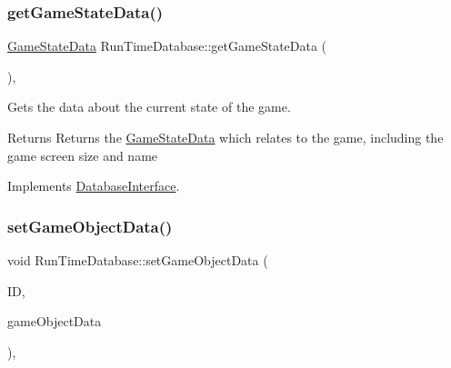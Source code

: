 \mbox{\label{class_run_time_database_a15d6105d3d772f604c42813e50ba4ee3}} 
\subsubsection{\texorpdfstring{get\+Game\+State\+Data()}{getGameStateData()}}
{\footnotesize\ttfamily \hyperlink{struct_game_state_data}{Game\+State\+Data} Run\+Time\+Database\+::get\+Game\+State\+Data (\begin{DoxyParamCaption}{ }\end{DoxyParamCaption})\hspace{0.3cm}{\ttfamily [override]}, {\ttfamily [virtual]}}



Gets the data about the current state of the game. 

\begin{DoxyReturn}{Returns}
Returns the \hyperlink{struct_game_state_data}{Game\+State\+Data} which relates to the game, including the game screen size and name 
\end{DoxyReturn}


Implements \hyperlink{class_database_interface_a5972ccdce7669da4eef8ab82c69fe073}{Database\+Interface}.

\mbox{\label{class_run_time_database_a9d2c5c2f1eb4dc728d69b9c5dbd1c22d}} 
\subsubsection{\texorpdfstring{set\+Game\+Object\+Data()}{setGameObjectData()}}
{\footnotesize\ttfamily void Run\+Time\+Database\+::set\+Game\+Object\+Data (\begin{DoxyParamCaption}\item[{std\+::string}]{ID,  }\item[{\hyperlink{struct_game_object_data}{Game\+Object\+Data}}]{game\+Object\+Data }\end{DoxyParamCaption})\hspace{0.3cm}{\ttfamily [override]}, {\ttfamily [virtual]}}



